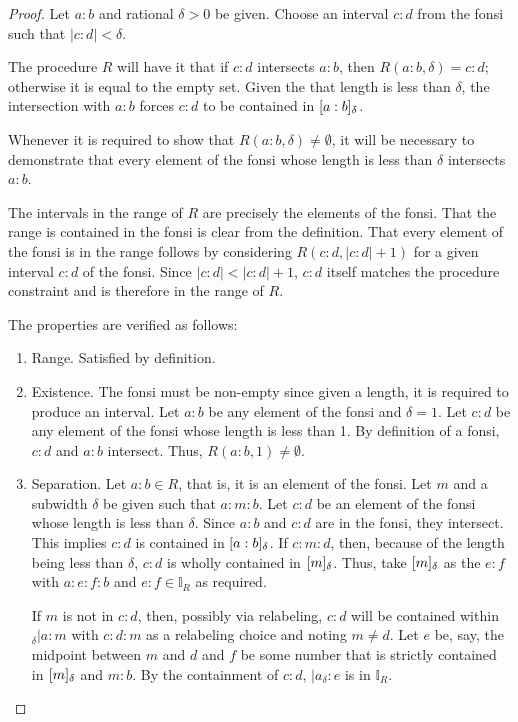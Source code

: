 \documentclass[12pt]{article}
\begin{document}
\begin{proof}
    Let $a:b$ and rational $\delta>0$ be given. Choose an interval $c:d$ from the fonsi such that $|c:d| < \delta$. 

    The procedure $R$ will have it that if $c:d$ intersects $a:b$, then $R(a:b, \delta) = c:d$; otherwise it is equal to the empty set. Given the that length is less than $\delta$, the intersection with $a:b$ forces $c:d$ to be contained in $[a:b]_{\delta}$.

    Whenever it is required to show that $R(a:b, \delta) \neq \emptyset$, it will be necessary to demonstrate that every element of the fonsi whose length is less than $\delta$ intersects $a:b$. 
    
    The intervals in the range of $R$ are precisely the elements of the fonsi. That the range is contained in the fonsi is clear from the definition. That every element of the fonsi is in the range follows by considering $R(c:d, |c:d|+1)$ for a given interval $c:d$ of the fonsi. Since $|c:d| < |c:d|+1$, $c:d$ itself matches the procedure constraint and is therefore in the range of $R$. 

    The properties are verified as follows: 
    \begin{enumerate}
        \item Range. Satisfied by definition. 
        \item Existence. The fonsi must be non-empty since given a length, it is required to produce an interval. Let $a:b$ be any element of the fonsi and $\delta =1$. Let $c:d$ be any element of the fonsi whose length is less than 1. By definition of a fonsi, $c:d$ and $a:b$ intersect. Thus, $R(a:b, 1) 
        \neq \emptyset$.
        \item Separation. 
        Let $a:b \in R$, that is, it is an element of the fonsi. Let $m$ and a subwidth $\delta$ be given such that $a:m:b$. Let $c:d$ be an element of the fonsi whose length is less than $\delta$. Since $a:b$ and $c:d$ are in the fonsi, they intersect. This implies $c:d$ is contained in $[a:b]_{\delta}$. If $c:m:d$, then, because of the length being less than $\delta$, $c:d$ is wholly contained in $[m]_{\delta}$. Thus, take $[m]_{\delta}$ as the $e:f$ with $a:e:f:b$ and $e:f \in \mathbb{I}_{R}$ as required. 
        
        If $m$ is not in $c:d$, then, possibly via relabeling, $c:d$ will be contained within ${}_\delta |a:m$ with $c:d:m$ as a relabeling choice and noting $m \neq d$. Let $e$ be, say, the midpoint between $m$ and $d$ and $f$ be some number that is strictly contained in $[m]_{\delta}$ and $m:b$. By the containment of $c:d$, $|a_\delta:e$ is in $\mathbb{I}_R$.
        

\end{enumerate}
\end{proof}
\end{document}
